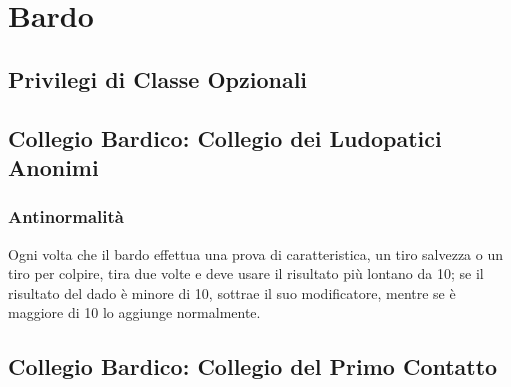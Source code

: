 \chapter{Bardo}

\section{Privilegi di Classe Opzionali}

\section{Collegio Bardico: Collegio dei Ludopatici Anonimi}

\subsection{Antinormalità}

Ogni volta che il bardo effettua una prova di caratteristica, un tiro salvezza o un tiro per colpire, tira due volte e deve usare il risultato più lontano da 10; se il risultato del dado è minore di 10, sottrae il suo modificatore, mentre se è maggiore di 10 lo aggiunge normalmente.

\section{Collegio Bardico: Collegio del Primo Contatto}

\begin{DndReadAloud}

\end{DndReadAloud}

\subsection{}
